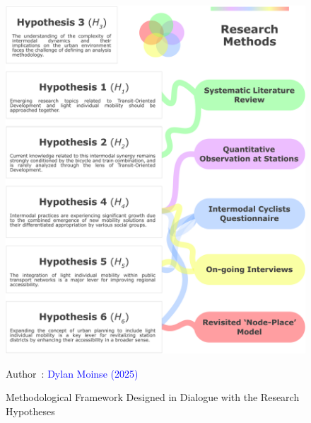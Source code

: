 \begin{refsegment}
    \begin{figure}[h!]\vspace*{4pt}
        \caption{Methodological Framework Designed in Dialogue with the Research Hypotheses}
        \label{fig-introduction:methodes-hypotheses}
        \centerline{\includegraphics[width=1\columnwidth]{src/Figures/Introduction/EN_Methodologie_hypotheses.pdf}}
        \vspace{5pt}
        \begin{flushright}\scriptsize{
        Author~: \textcolor{blue}{Dylan Moinse (2025)}
        }\end{flushright}
    \end{figure}


\end{refsegment}
